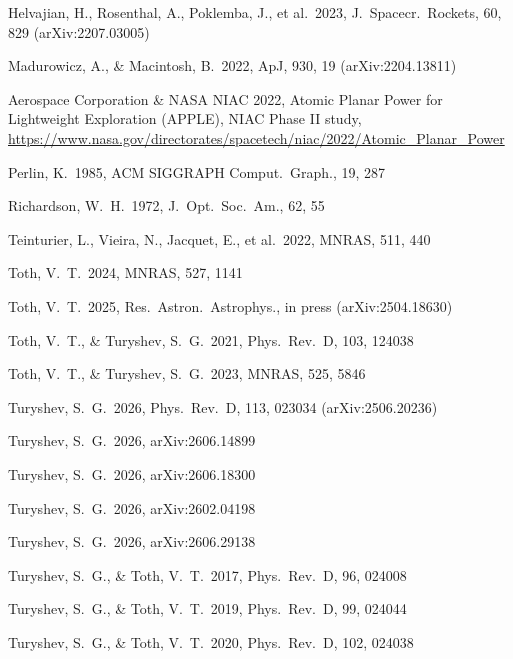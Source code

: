 ﻿\documentclass[twocolumn]{emulateapj}
\begin{document}
\begin{thebibliography}{}
Helvajian, H., Rosenthal, A., Poklemba, J., et al.\ 2023, J.\ Spacecr.\
Rockets, 60, 829 (arXiv:2207.03005)

Madurowicz, A., \& Macintosh, B.\ 2022, ApJ, 930, 19 (arXiv:2204.13811)

Aerospace Corporation \& NASA NIAC 2022, Atomic Planar Power for
Lightweight Exploration (APPLE), NIAC Phase II study,
\url{https://www.nasa.gov/directorates/spacetech/niac/2022/Atomic_Planar_Power}

Perlin, K.\ 1985, ACM SIGGRAPH Comput.\ Graph., 19, 287

Richardson, W.~H.\ 1972, J.\ Opt.\ Soc.\ Am., 62, 55

Teinturier, L., Vieira, N., Jacquet, E., et al.\ 2022, MNRAS, 511, 440

Toth, V.~T.\ 2024, MNRAS, 527, 1141

Toth, V.~T.\ 2025, Res.\ Astron.\ Astrophys., in press
(arXiv:2504.18630)

Toth, V.~T., \& Turyshev, S.~G.\ 2021, Phys.\ Rev.\ D, 103, 124038

Toth, V.~T., \& Turyshev, S.~G.\ 2023, MNRAS, 525, 5846

Turyshev, S.~G.\ 2026, Phys.\ Rev.\ D, 113, 023034 (arXiv:2506.20236)

Turyshev, S.~G.\ 2026, arXiv:2606.14899

Turyshev, S.~G.\ 2026, arXiv:2606.18300

Turyshev, S.~G.\ 2026, arXiv:2602.04198

Turyshev, S.~G.\ 2026, arXiv:2606.29138

Turyshev, S.~G., \& Toth, V.~T.\ 2017, Phys.\ Rev.\ D, 96, 024008

Turyshev, S.~G., \& Toth, V.~T.\ 2019, Phys.\ Rev.\ D, 99, 024044

Turyshev, S.~G., \& Toth, V.~T.\ 2020, Phys.\ Rev.\ D, 102, 024038


\end{thebibliography}
\end{document}
